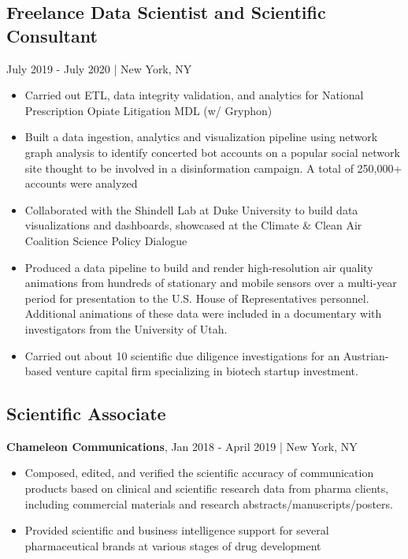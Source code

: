 \documentclass[11pt]{article}
\newenvironment{myitemize}
{ \begin{itemize}
	\setlength{\itemsep}{0pt}
	\setlength{\parskip}{0pt}
	\setlength{\parsep}{0pt}     }
{ \end{itemize}                  }
\begin{document}
\subsection*{Freelance Data Scientist and Scientific Consultant} July 2019 - July 2020 | New York, NY
\begin{myitemize}
	\item Carried out ETL, data integrity validation, and analytics for National Prescription Opiate Litigation MDL (w/ Gryphon)
	\item Built a data ingestion, analytics and visualization pipeline using network graph analysis to identify concerted bot accounts on a popular social network site thought to be involved in a disinformation campaign. A total of 250,000+ accounts were analyzed
	\item Collaborated with the Shindell Lab at Duke University to build data visualizations and dashboards, showcased at the Climate \& Clean Air Coalition Science Policy Dialogue
	\item Produced a data pipeline to build and render high-resolution air quality animations from hundreds of stationary and mobile sensors over a multi-year period for presentation to the U.S. House of Representatives personnel. Additional animations of these data were included in a documentary with investigators from the University of Utah.
	\item Carried out about 10 scientific due diligence investigations for an Austrian-based venture capital firm specializing in biotech startup investment.
\end{myitemize}

\subsection*{Scientific Associate}
{\bfseries Chameleon Communications}, Jan 2018 - April 2019 | New York, NY
\begin{myitemize}
	\item Composed, edited, and verified the scientific accuracy of communication products based on clinical and scientific research data from pharma clients, including commercial
	materials and research abstracts/manuscripts/posters.
	\item Provided scientific and business intelligence support for several pharmaceutical brands at various stages of drug development
\end{myitemize}
\end{document}
